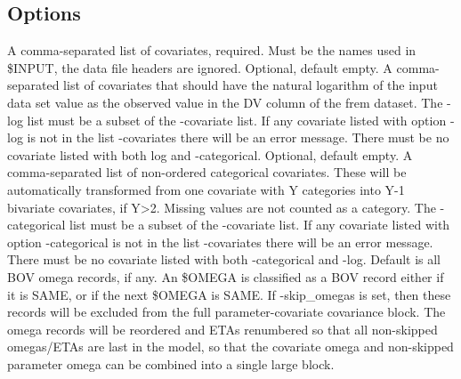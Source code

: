\subsection{Options}
\begin{optionlist}
A comma-separated list of covariates, required. Must be the names used in \$INPUT, the data file headers are ignored.
\nextopt
{}
Optional, default empty. A comma-separated list of covariates
that should have the natural logarithm
of the input data set value as the observed value in the DV column of the frem dataset.
The -log list must be a subset of the -covariate list.
If any covariate listed with option -log is not in the list -covariates there will be an error message.
There must be no covariate listed with both log and -categorical.
\nextopt
Optional, default empty.
A comma-separated list of non-ordered categorical covariates. These will be automatically transformed from
one covariate with Y categories into Y-1 bivariate covariates, if Y>2. Missing values are not counted as a category.
The -categorical list must be a subset of the -covariate list.
If any covariate listed with option -categorical is not in the list -covariates there will be an error message.
There must be no covariate listed with both -categorical and -log.
\nextopt
{}
Default is all BOV omega records, if any.
An \$OMEGA is classified as a BOV record either if it is SAME, or if the next \$OMEGA is SAME.
If -skip\_omegas is set,
then these records will be excluded from the full parameter-covariate covariance block.
The omega records will be reordered and ETAs renumbered so that all non-skipped
omegas/ETAs are last in the model, so that the covariate omega and non-skipped parameter omega
can be combined into a single large block.


\end{optionlist}
